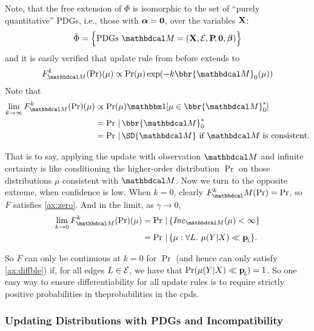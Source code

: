 \documentclass{article}
\begin{document}
Note, that the free extension of $\Phi$ is isomorphic to the set of ``purely quantitative'' PDGs, i.e., those with $\boldsymbol\alpha = \mathbf{0}$, over the variables $\mathbf{X}$:
$$
    \bar\Phi = \Big\{ \text{PDGs}~\dg M = (\mat X, \Ed, \bP[], \mat0, \bbeta) \Big\}
$$
and it is easily verified that update rule from before extends to
\[
    F_{\dg M}^k(\Pr)(\mu) \propto \Pr(\mu) \exp(- k \bbr{\dg M}_0(\mu))
\]
Note that
\begin{align*}
    \lim_{k \to \infty} F_{\dg M}^k(\Pr)(\mu) &\propto
        \Pr(\mu) \mathbbm1[\mu \in {\bbr{\dg M}^*_0}] \\
        &= \Pr \,|\, \bbr{\dg M}^*_0 \\
        &= \Pr \,|\, \SD{\dg M} \text{~if $\dg M$ is consistent.}
\end{align*}

That is to say, applying the update with observation $\dg M$ and infinite certainty is like conditioning the higher-order distribution $\Pr$ on those distributions $\mu$ consistent with $\dg M$.
Now we turn to the opposite extreme, when confidence is low. When $k=0$, clearly $F^k_\dg M(\Pr) = \Pr$, so $F$ satisfies \cref{ax:zero}. And in the limit, as $\gamma \to 0$,
\begin{align*}
    \lim_{k \to 0} F_{\dg M}^k(\Pr)(\mu) &= \Pr \,|\, \{ \Inc_{\dg M}(\mu) < \infty \} \\
        &= \Pr \,|\, \{\mu : \forall L.~\mu(Y|X) \ll \bp \}.
\end{align*}

So $F$ can only be continuous at $k=0$ for $\Pr$ (and hence can only satisfy \cref{ax:diffble}) if, for all edges $L \in \mathcal E$, we have that $\Pr(\mu(Y|X) \ll \mathbf{p}_{\!_{L}\!}) = 1$.
So one easy way to ensure differentiability for all update rules is to require strictly positive probabilities in theprobabilities in the cpds.



\subsubsection{Updating Distributions with PDGs and Incompatibility}
\def\tauur{\mathtt{CPD\_UR}}
\end{document}
